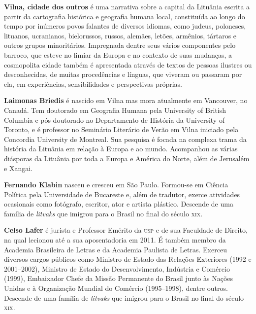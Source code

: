 \textbf{Vilna, cidade dos outros} é uma narrativa sobre a capital da Lituânia escrita a partir da cartografia histórica e geografia humana local, constituída ao longo do tempo por inúmeros povos falantes de diversos idiomas, como judeus, poloneses, lituanos, ucranianos, bielorussos, russos, alemães, letões, armênios, tártaros e outros grupos minoritários. Impregnada dentre seus vários componentes pelo barroco, que esteve no limiar da Europa e no contexto de suas mudanças, a cosmopolita cidade também é apresentada através de textos de pessoas ilustres ou desconhecidas, de muitas procedências e línguas, que viveram ou passaram por ela, em experiências, sensibilidades e perspectivas próprias.

\textbf{Laimonas Briedis} é nascido em Vilna mas mora atualmente em Vancouver, no Canadá. Tem doutorado em Geografia Humana pela University of British Columbia e pós-doutorado no Departamento de História da University of Toronto, e é professor no Seminário Literário de Verão em Vilna iniciado pela Concordia University de Montreal. Sua pesquisa é focada na complexa trama da história da Lituânia em relação à Europa e ao mundo. Acompanhou as várias diásporas da Lituânia por toda a Europa e América do Norte, além de Jerusalém e Xangai.

\textbf{Fernando Klabin} nasceu e cresceu em São Paulo. Formou-se em Ciência Política pela Universidade de Bucareste e, além de tradutor, exerce atividades ocasionais como fotógrafo, escritor, ator e artista plástico. Descende de uma família de \textit{litvaks} que imigrou para o Brasil no final do século \textsc{xix}.

\textbf{Celso Lafer} é jurista e Professor Emérito da \textsc{usp} e de sua Faculdade de Direito, na qual lecionou até a sua aposentadoria em 2011. É também membro da Academia Brasileira de Letras e da Academia Paulista de Letras. Exerceu diversos cargos públicos como Ministro de Estado das Relações Exteriores (1992 e 2001--2002), Ministro de Estado do Desenvolvimento, Indústria e Comércio (1999), Embaixador Chefe da Missão Permanente do Brasil junto às Nações Unidas e à Organização Mundial do Comércio (1995--1998), dentre outros. Descende de uma família de \textit{litvaks} que imigrou para o Brasil no final do século \textsc{xix}.




